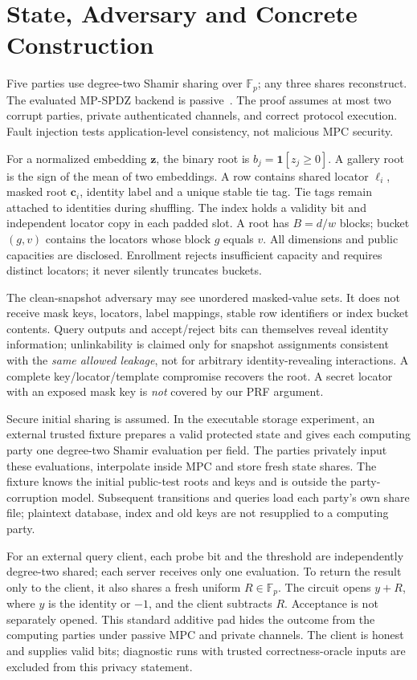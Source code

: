 \documentclass[journal]{IEEEtran}
\begin{document}
\section{State, Adversary and Concrete Construction}\label{sec:state}
Five parties use degree-two Shamir sharing over $\mathbb F_p$; any three shares reconstruct. The evaluated MP-SPDZ backend is passive~\cite{keller2020mpspdz}. The proof assumes at most two corrupt parties, private authenticated channels, and correct protocol execution. Fault injection tests application-level consistency, not malicious MPC security.

For a normalized embedding $\mathbf z$, the binary root is $b_j=\mathbf1[z_j\ge0]$. A gallery root is the sign of the mean of two embeddings. A row contains shared locator $\ell_i$, masked root $\mathbf c_i$, identity label and a unique stable tie tag. Tie tags remain attached to identities during shuffling. The index holds a validity bit and independent locator copy in each padded slot. A root has $B=d/w$ blocks; bucket $(g,v)$ contains the locators whose block $g$ equals $v$. All dimensions and public capacities are disclosed. Enrollment rejects insufficient capacity and requires distinct locators; it never silently truncates buckets.

The clean-snapshot adversary may see unordered masked-value sets. It does not receive mask keys, locators, label mappings, stable row identifiers or index bucket contents. Query outputs and accept/reject bits can themselves reveal identity information; unlinkability is claimed only for snapshot assignments consistent with the \emph{same allowed leakage}, not for arbitrary identity-revealing interactions. A complete key/locator/template compromise recovers the root. A secret locator with an exposed mask key is \emph{not} covered by our PRF argument.

Secure initial sharing is assumed. In the executable storage experiment, an external trusted fixture prepares a valid protected state and gives each computing party one degree-two Shamir evaluation per field. The parties privately input these evaluations, interpolate inside MPC and store fresh state shares. The fixture knows the initial public-test roots and keys and is outside the party-corruption model. Subsequent transitions and queries load each party's own share file; plaintext database, index and old keys are not resupplied to a computing party.

For an external query client, each probe bit and the threshold are independently degree-two shared; each server receives only one evaluation. To return the result only to the client, it also shares a fresh uniform $R\in\mathbb F_p$. The circuit opens $y+R$, where $y$ is the identity or $-1$, and the client subtracts $R$. Acceptance is not separately opened. This standard additive pad hides the outcome from the computing parties under passive MPC and private channels. The client is honest and supplies valid bits; diagnostic runs with trusted correctness-oracle inputs are excluded from this privacy statement.
\end{document}
